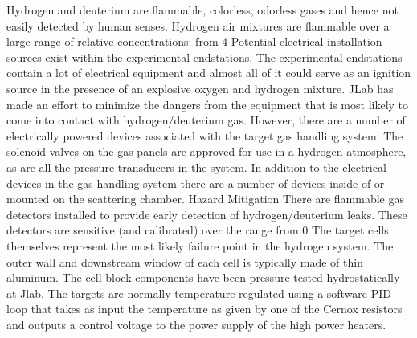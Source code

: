 {	Hydrogen and deuterium are flammable, colorless, odorless gases and hence not easily detected by human senses. Hydrogen air mixtures are flammable over a large range of relative concentrations: from 4%
	Potential electrical installation sources exist within the experimental endstations. The experimental endstations contain a lot of electrical equipment and almost all of it could serve as an ignition source in the presence of an explosive oxygen and hydrogen mixture. JLab has made an effort to minimize the dangers from the equipment that is most likely to come into contact with hydrogen/deuterium gas. However, there are a number of electrically powered devices associated with the target gas handling system. The solenoid valves on the gas panels are approved for use in a hydrogen atmosphere, as are all the pressure transducers in the system. In addition to the electrical devices in the gas handling system there are a number of devices inside of or mounted on the scattering chamber. 
Hazard Mitigation
	There are flammable gas detectors installed to provide early detection of hydrogen/deuterium leaks. These detectors are sensitive (and calibrated) over the range from 0%
	The target cells themselves represent the most likely failure point in the hydrogen system. The outer wall and downstream window of each cell is typically made of thin aluminum. The cell block components have been pressure tested hydrostatically at Jlab. The targets are normally temperature regulated using a software PID loop that takes as input the temperature as given by one of the Cernox resistors and outputs a control voltage to the power supply of the high power heaters.
}
